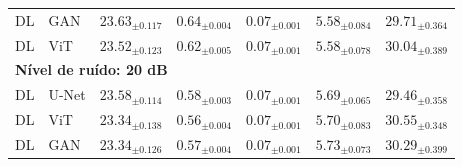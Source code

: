 \begin{table}[htbp]
{\begin{tabular}{llccccc}
DL & GAN & $23.63_{\pm 0.117}$ & $0.64_{\pm 0.004}$ & $0.07_{\pm 0.001}$ & $5.58_{\pm 0.084}$ & $29.71_{\pm 0.364}$ \\
DL & ViT & $23.52_{\pm 0.123}$ & $0.62_{\pm 0.005}$ & $0.07_{\pm 0.001}$ & $5.58_{\pm 0.078}$ & $30.04_{\pm 0.389}$ \\
\midrule
\multicolumn{7}{l}{\textbf{Nível de ruído: 20 dB}} \\
DL & U-Net & $\mathbf{23.58_{\pm 0.114}}$ & $\mathbf{0.58_{\pm 0.003}}$ & $\mathbf{0.07_{\pm 0.001}}$ & $\mathbf{5.69_{\pm 0.065}}$ & $\mathbf{29.46_{\pm 0.358}}$ \\
DL & ViT & $23.34_{\pm 0.138}$ & $0.56_{\pm 0.004}$ & $0.07_{\pm 0.001}$ & $5.70_{\pm 0.083}$ & $30.55_{\pm 0.348}$ \\
DL & GAN & $23.34_{\pm 0.126}$ & $0.57_{\pm 0.004}$ & $0.07_{\pm 0.001}$ & $5.73_{\pm 0.073}$ & $30.29_{\pm 0.399}$ \\
\bottomrule
\end{tabular}
}
\end{table}
